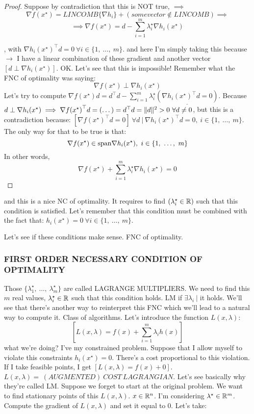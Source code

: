 \begin{proof}
Suppose by contradiction that this is NOT true, $\implies$
\[
	\nabla{f(x^\star)} = LINCOMB\{\nabla{h_i}\} + (somevector \notin LINCOMB) \implies
\]
\[
	\implies \nabla{f(x^\star)} = d - \sum_{i=1}^m{\lambda_i^\star\nabla{h_i(x^\star)}}
\]

, with $\nabla{h_i(x^\star)}^\top d = 0\ \forall i \in\{1,\ \dots,\ m\}$. and here I'm simply taking this because $\rightarrow$ I have a linear combination of these gradient and another vector $[d \perp \nabla{h_i(x^\star)}]$. OK. Let's see that this is impossible! Remember what the FNC of optimality was saying:
\[
	\nabla{f(x^\star)} \perp \nabla{h_i(x^\star)}
\]
Let's try to compute $\nabla{f(x^\star)}d = d^\top d -\sum_{i=1}^m{\lambda_i^\star\underline{(\nabla{h_i(x^\star)}^\top d = 0)}}$.  Because $d \perp \nabla{h_i(x^\star)} \implies \nabla{f(x^\star)}^\top d = (\dots) = d^\top d = \norma{d}^2 > 0\ \forall d \neq 0$, but this is a contradiction because: $[\nabla{f(x^\star)}^\top d = 0]\ \forall d\ |\ \nabla{h_i(x^\star)}^\top d = 0,\ i\in\{1,\ \dots,\ m\}$. The only way for that to be true is that:
\[
	\nabla{f(x^\star)} \in \mathop{}\!\mathrm{span}{\nabla{h_i(x^\star)},\ i\in\{1,\ \dots,\ m\}}
\]
In other words,
\[
	\nabla{f(x^\star)} + \sum_{i=1}^m{\lambda_i^\star\nabla{h_i(x^\star)}} = 0
\]
\end{proof}

and this is a nice NC of optimality. It requires to find $(\lambda_i^\star\in\mathbb{R})$ such that this condition is satisfied. Let's remember that this condition must be combined with the fact that: $h_i(x^\star) = 0\ \forall i\in\{1,\ \dots,\ m\}$. 

Let's see if these conditions make sense. FNC of optimality.

\subsubsection{FIRST ORDER NECESSARY CONDITION OF OPTIMALITY}

Those $\{\lambda_1^\star,\ \dots,\ \lambda_m^\star\}$ are called LAGRANGE MULTIPLIERS. We need to find this $m$ real values, $\lambda_i^\star\in\mathbb{R}$ such that this condition holds. LM if $\exists\lambda_i\ |$ it holds. We'll see that there's another way to reinterpret this FNC which we'll lead to a natural way to compute it. Class of algorithms. Let's introduce the function $L(x,\lambda)$:
\[
	[L(x,\lambda) = f(x) + \sum_{i=1}^m{\lambda_ih(x)}]
\]
what we're doing? I've my constrained problem. Suppose that I allow myself to violate this constraints $h_i(x^\star) = 0$. There's a cost proportional to this violation. If I take feasible points, I get $[L(x,\lambda) = f(x) + 0]$. $L(x,\lambda)=\ (AUGMENTED)\ COST\ LAGRANGIAN$. Let's see basically why they're called LM. Suppose we forget to start at the original problem. We want to find stationary points of this $L(x,\lambda)$. $x\in\mathbb{R}^n$. I'm considering $\lambda^\star\in\mathbb{R}^m$. Compute the gradient of $L(x,\lambda)$ and set it equal to 0. Let's take:

